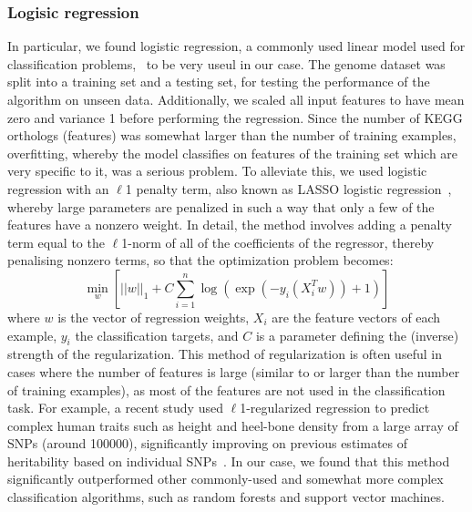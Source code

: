 \documentclass[10pt,letterpaper]{article}
\begin{document}
\subsubsection*{Logisic regression}
In particular, we found logistic regression, a commonly used linear model used for classification problems,~\cite{Hastie2009a,Freedman2009} to be very useul in our case. The genome dataset was split into a training set and a testing set, for testing the performance of the algorithm on unseen data. Additionally, we scaled all input features to have mean zero and variance 1 before performing the regression. Since the number of KEGG orthologs (features) was somewhat larger than the number of training examples, overfitting, whereby the model classifies on features of the training set which are very specific to it, was a serious problem. To alleviate this, we used logistic regression with an $\ell$1 penalty term, also known as LASSO logistic regression~\cite{Lee2006}, whereby large parameters are penalized in such a way that only a few of the features have a nonzero weight. In detail, the method involves adding a penalty term equal to the $\ell$1-norm of all of the coefficients of the regressor, thereby penalising nonzero terms, so that the optimization problem becomes:
\begin{equation}
\min_{w}\left[||w||_1 + C\sum_{i=1}^{n}\log\left(\exp(-y_i(X_i^T w )) + 1\right)\right]
\end{equation}
where $w$ is the vector of regression weights, $X_i$ are the feature vectors of each example, $y_i$ the classification targets, and $C$ is a parameter defining the (inverse) strength of the regularization. This method of regularization is often useful in cases where the number of features is large (similar to or larger than the number of training examples), as most of the features are not used in the classification task. For example, a recent study used $\ell$1-regularized regression to predict complex human traits such as height and heel-bone density from a large array of SNPs (around 100000), significantly improving on previous estimates of heritability based on individual SNPs~\cite{Lello2017}. In our case, we found that this method significantly outperformed other commonly-used and somewhat more complex classification algorithms, such as random forests and support vector machines.
\end{document}
